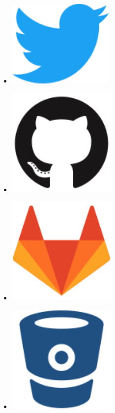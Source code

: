 \documentclass[a4paper,oneside,10pt]{article}
\begin{document}
\begin{multicols}{9}
\begin{itemize}
\item[]\href{https://twitter.com/metimdjai}{\includegraphics[scale=0.2]{assets/twitter-original.pdf}}

\item[]\href{https://github.com/iosang}{\includegraphics[scale=0.2]{assets/github-original.pdf}}

\item[]\href{https://gitlab.com/metimdjai}{\includegraphics[scale=0.2]{assets/gitlab-original.pdf}}

\item[]\href{https://bitbucket.org/Metimdjai/}{\includegraphics[scale=0.2]{assets/bitbucket-original.pdf}}


\end{itemize}
\end{multicols}
\end{document}
